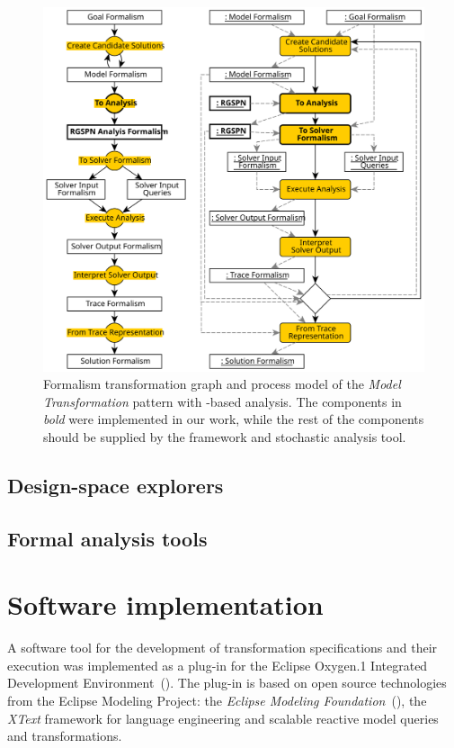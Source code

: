\begin{figure}
  \centering
  \includegraphics[scale=0.9]{figures/dse_ftg_pm}
  \caption{Formalism transformation graph and process model of the \emph{Model Transformation}  pattern with -based analysis. The components in \emph{bold} were implemented in our work, while the rest of the components should be supplied by the  framework and stochastic analysis tool.}
\end{figure}

\subsection{Design-space explorers}

\subsection{Formal analysis tools}

\section{Software implementation}

A software tool for the development of transformation specifications and their execution was implemented as a plug-in for the Eclipse Oxygen.1 Integrated Development Environment~(). The plug-in is based on open source technologies from the Eclipse Modeling Project: the \emph{Eclipse Modeling Foundation}~(), the \emph{XText} framework for language engineering and \emph{} scalable reactive model queries and transformations.

